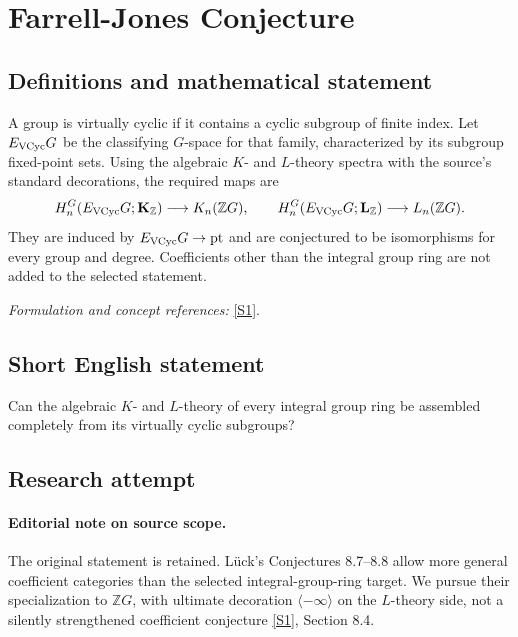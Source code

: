 \documentclass[11pt,a4paper]{article}
\newcommand{\Z}{\mathbb{Z}}
\newcommand{\sref}[2]{\hyperlink{source:#1:#2}{[S#2]}}
\newif\ifshowcatalogue
\newcommand{\cataloguescope}[1]{\ifshowcatalogue
 \paragraph{Exact scope in the supplied catalogue.}
 \begin{quote}\small #1\end{quote}\fi}
\numberwithin{equation}{section}
\begin{document}
\setcounter{section}{0}
\clearpage
\section*{\texorpdfstring{Farrell-Jones Conjecture}{Farrell-Jones Conjecture}}\label{statement}
\subsection{Definitions and mathematical statement}
A group is virtually cyclic if it contains a cyclic subgroup of finite index. Let $E_{\rm VCyc}G$ be the classifying $G$-space for that family, characterized by its subgroup fixed-point sets. Using the algebraic $K$- and $L$-theory spectra with the source's standard decorations, the required maps are
\[
 H_n^G(E_{\rm VCyc}G;\mathbf K_{\Z})\longrightarrow K_n(\Z G),\qquad
 H_n^G(E_{\rm VCyc}G;\mathbf L_{\Z})\longrightarrow L_n(\Z G).
\]
They are induced by $E_{\rm VCyc}G\to\mathrm{pt}$ and are conjectured to be isomorphisms for every group and degree. Coefficients other than the integral group ring are not added to the selected statement.
\par\smallskip\textit{Formulation and concept references:} \sref{statement}{1}.
\cataloguescope{Prove the Farrell-Jones conjecture for every group G: the assembly maps from the equivariant homology of the classifying space for the family of virtually cyclic subgroups to the algebraic K-theory, respectively L-theory, of the group ring \ensuremath{\mathbb Z}G are isomorphisms.}
\subsection{Short English statement}
Can the algebraic $K$- and $L$-theory of every integral group ring be assembled completely from its virtually cyclic subgroups?
\subsection{Research attempt}

\paragraph{Editorial note on source scope.}
The original statement is retained. Lück's Conjectures 8.7--8.8 allow more general coefficient categories than the selected integral-group-ring target. We pursue their specialization to $\Z G$, with ultimate decoration $\langle-\infty\rangle$ on the $L$-theory side, not a silently strengthened coefficient conjecture \sref{statement}{1}, Section 8.4.
\end{document}
